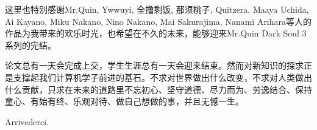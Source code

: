 \par 这里也特别感谢Mr.Quin, Ywwuyi, 全撸剩饭, 那须桃子, Quitzera, Maaya Uchida, Ai Kayano, Miku Nakano, Nino Nakano, Mai Sakurajima, Nanami Arihara等人的作品为我带来的欢乐时光，也希望在不久的未来，能够迎来Mr.Quin Dark Soul 3系列的完结。
\par 论文总有一天会完成上交，学生生涯总有一天会迎来结束。然而对新知识的探求正是支撑起我们计算机学子前进的基石。不求对世界做出什么改变，不求对人类做出什么贡献，只求在未来的道路里不忘初心、坚守道德、尽力而为、劳逸结合、保持童心、有始有终、乐观对待、做自己想做的事，并且无憾一生。
\par Arrivederci.
